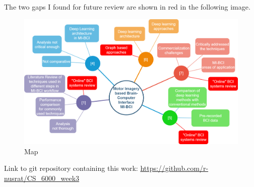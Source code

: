 The two gaps I found for future review are shown in red in the following image. 
\begin{figure}[h]
\includegraphics[width=1\textwidth, inner]{body/map}
\caption{Map}
\label{fig:figure2}
\end{figure}

\vspace{5mm}
Link to git repository containing this work: \url{https://github.com/r-nusrat/CS_6000_week3}
\nocite{*}